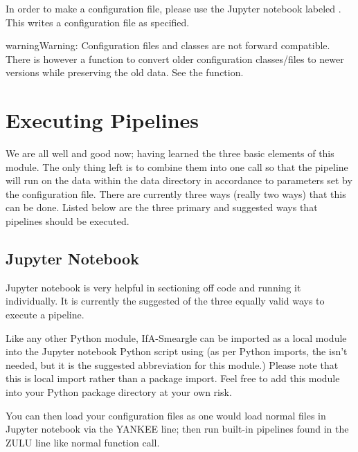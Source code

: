 \documentclass[letterpaper,10pt,english]{sphinxmanual}
\begin{document}
In order to make a configuration file, please use the Jupyter notebook labeled
. This writes a configuration file as
specified.

\begin{sphinxadmonition}{warning}{Warning:}
Configuration files and classes are not forward compatible. There
is however a function to convert older configuration classes/files to newer
versions while preserving the old data. See the {\hyperref[\detokenize{python_docstrings/IfA_Smeargle.yankee.yankee_functions:IfA_Smeargle.yankee.yankee_functions.fast_forward_configuration_class}]{}} function.
\end{sphinxadmonition}


\section{Executing Pipelines}
\label{\detokenize{quickstart:executing-pipelines}}
We are all well and good now; having learned the three basic elements of this
module. The only thing left is to combine them into one call so that the
pipeline will run on the data within the data directory in accordance to
parameters set by the configuration file. There are currently three ways
(really two ways) that this can be done. Listed below are the three primary
and suggested ways that pipelines should be executed.


\subsection{Jupyter Notebook}
\label{\detokenize{quickstart:jupyter-notebook}}
Jupyter notebook is very helpful in sectioning off code and running it
individually. It is currently the suggested of the three equally valid ways
to execute a pipeline.

Like any other Python module, IfA-Smeargle can be imported as a local module
into the Jupyter notebook Python script using 
(as per Python imports, the  isn’t needed, but it is the suggested
abbreviation for this module.) Please note that this is local import rather
than a package import. Feel free to add this module into your Python package
directory at your own risk.

You can then load your configuration files as one would load normal files in
Jupyter notebook via the YANKEE line; then run built-in pipelines found in the
ZULU line like normal function call.
\end{document}

